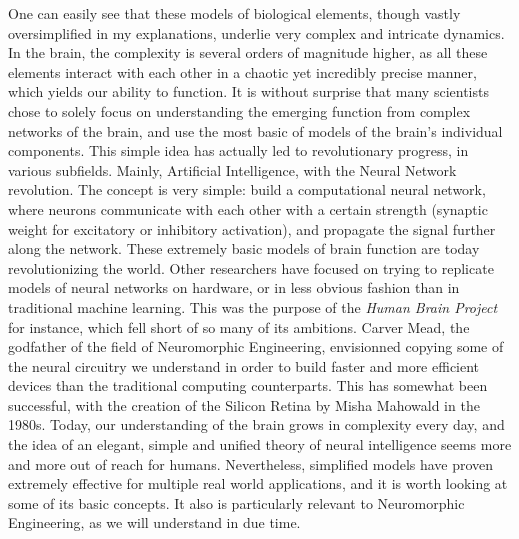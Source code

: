 One can easily see that these models of biological elements, though vastly oversimplified in my explanations, underlie very complex and intricate dynamics. In the brain, the complexity is several orders of magnitude higher, as all these elements interact with each other in a chaotic yet incredibly precise manner, which yields our ability to function. It is without surprise that many scientists chose to solely focus on understanding the emerging function from complex networks of the brain, and use the most basic of models of the brain's individual components. This simple idea has actually led to revolutionary progress, in various subfields. Mainly, Artificial Intelligence, with the Neural Network revolution. The concept is very simple: build a computational neural network, where neurons communicate with each other with a certain strength (synaptic weight for excitatory or inhibitory activation), and propagate the signal further along the network. These extremely basic models of brain function are today revolutionizing the world. Other researchers have focused on trying to replicate models of neural networks on hardware, or in less obvious fashion than in traditional machine learning. This was the purpose of the \textit{Human Brain Project} for instance, which fell short of so many of its ambitions. Carver Mead, the godfather of the field of Neuromorphic Engineering, envisionned copying some of the neural circuitry we understand in order to build faster and more efficient devices than the traditional computing counterparts. This has somewhat been successful, with the creation of the Silicon Retina by Misha Mahowald in the 1980s. 
Today, our understanding of the brain grows in complexity every day, and the idea of an elegant, simple and unified theory of neural intelligence seems more and more out of reach for humans. Nevertheless, simplified models have proven extremely effective for multiple real world applications, and it is worth looking at some of its basic concepts. It also is particularly relevant to Neuromorphic Engineering, as we will understand in due time. 